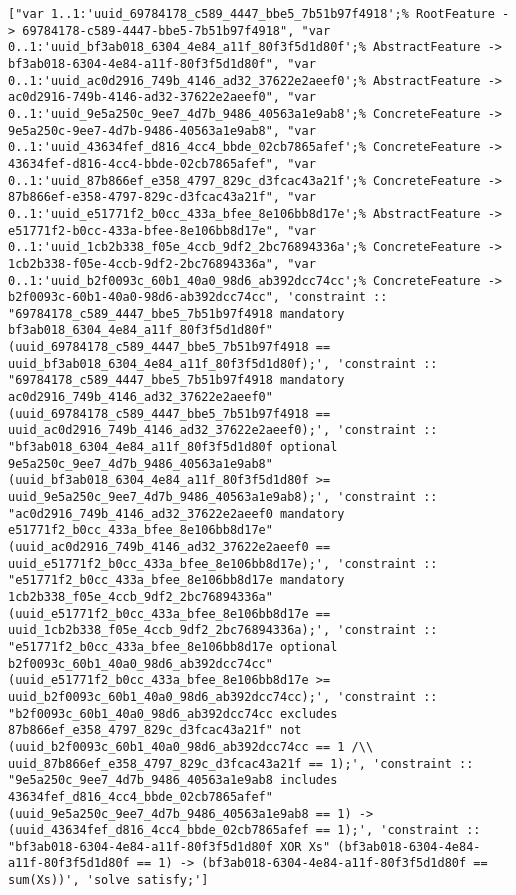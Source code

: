 \documentclass[11pt]{article}
\begin{document}
\begin{verbatim}
["var 1..1:'uuid_69784178_c589_4447_bbe5_7b51b97f4918';% RootFeature -> 69784178-c589-4447-bbe5-7b51b97f4918", "var 0..1:'uuid_bf3ab018_6304_4e84_a11f_80f3f5d1d80f';% AbstractFeature -> bf3ab018-6304-4e84-a11f-80f3f5d1d80f", "var 0..1:'uuid_ac0d2916_749b_4146_ad32_37622e2aeef0';% AbstractFeature -> ac0d2916-749b-4146-ad32-37622e2aeef0", "var 0..1:'uuid_9e5a250c_9ee7_4d7b_9486_40563a1e9ab8';% ConcreteFeature -> 9e5a250c-9ee7-4d7b-9486-40563a1e9ab8", "var 0..1:'uuid_43634fef_d816_4cc4_bbde_02cb7865afef';% ConcreteFeature -> 43634fef-d816-4cc4-bbde-02cb7865afef", "var 0..1:'uuid_87b866ef_e358_4797_829c_d3fcac43a21f';% ConcreteFeature -> 87b866ef-e358-4797-829c-d3fcac43a21f", "var 0..1:'uuid_e51771f2_b0cc_433a_bfee_8e106bb8d17e';% AbstractFeature -> e51771f2-b0cc-433a-bfee-8e106bb8d17e", "var 0..1:'uuid_1cb2b338_f05e_4ccb_9df2_2bc76894336a';% ConcreteFeature -> 1cb2b338-f05e-4ccb-9df2-2bc76894336a", "var 0..1:'uuid_b2f0093c_60b1_40a0_98d6_ab392dcc74cc';% ConcreteFeature -> b2f0093c-60b1-40a0-98d6-ab392dcc74cc", 'constraint :: "69784178_c589_4447_bbe5_7b51b97f4918 mandatory bf3ab018_6304_4e84_a11f_80f3f5d1d80f" (uuid_69784178_c589_4447_bbe5_7b51b97f4918 == uuid_bf3ab018_6304_4e84_a11f_80f3f5d1d80f);', 'constraint :: "69784178_c589_4447_bbe5_7b51b97f4918 mandatory ac0d2916_749b_4146_ad32_37622e2aeef0" (uuid_69784178_c589_4447_bbe5_7b51b97f4918 == uuid_ac0d2916_749b_4146_ad32_37622e2aeef0);', 'constraint :: "bf3ab018_6304_4e84_a11f_80f3f5d1d80f optional 9e5a250c_9ee7_4d7b_9486_40563a1e9ab8" (uuid_bf3ab018_6304_4e84_a11f_80f3f5d1d80f >= uuid_9e5a250c_9ee7_4d7b_9486_40563a1e9ab8);', 'constraint :: "ac0d2916_749b_4146_ad32_37622e2aeef0 mandatory e51771f2_b0cc_433a_bfee_8e106bb8d17e" (uuid_ac0d2916_749b_4146_ad32_37622e2aeef0 == uuid_e51771f2_b0cc_433a_bfee_8e106bb8d17e);', 'constraint :: "e51771f2_b0cc_433a_bfee_8e106bb8d17e mandatory 1cb2b338_f05e_4ccb_9df2_2bc76894336a" (uuid_e51771f2_b0cc_433a_bfee_8e106bb8d17e == uuid_1cb2b338_f05e_4ccb_9df2_2bc76894336a);', 'constraint :: "e51771f2_b0cc_433a_bfee_8e106bb8d17e optional b2f0093c_60b1_40a0_98d6_ab392dcc74cc" (uuid_e51771f2_b0cc_433a_bfee_8e106bb8d17e >= uuid_b2f0093c_60b1_40a0_98d6_ab392dcc74cc);', 'constraint :: "b2f0093c_60b1_40a0_98d6_ab392dcc74cc excludes 87b866ef_e358_4797_829c_d3fcac43a21f" not (uuid_b2f0093c_60b1_40a0_98d6_ab392dcc74cc == 1 /\\ uuid_87b866ef_e358_4797_829c_d3fcac43a21f == 1);', 'constraint :: "9e5a250c_9ee7_4d7b_9486_40563a1e9ab8 includes 43634fef_d816_4cc4_bbde_02cb7865afef" (uuid_9e5a250c_9ee7_4d7b_9486_40563a1e9ab8 == 1) -> (uuid_43634fef_d816_4cc4_bbde_02cb7865afef == 1);', 'constraint :: "bf3ab018-6304-4e84-a11f-80f3f5d1d80f XOR Xs" (bf3ab018-6304-4e84-a11f-80f3f5d1d80f == 1) -> (bf3ab018-6304-4e84-a11f-80f3f5d1d80f == sum(Xs))', 'solve satisfy;']

\end{verbatim}
\end{document}
